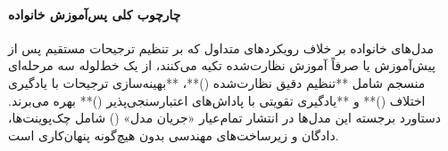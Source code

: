 \item {}

\paragraph*{چارچوب کلی پس‌آموزش خانواده }
مدل‌های خانواده  \cite{olmo3} بر خلاف رویکردهای متداول که بر تنظیم ترجیحات مستقیم پس از پیش‌آموزش یا صرفاً آموزش نظارت‌شده تکیه می‌کنند، از یک خط‌لوله سه مرحله‌ای منسجم شامل **تنظیم دقیق نظارت‌شده ()**، **بهینه‌سازی ترجیحات با یادگیری اختلاف ()** و **یادگیری تقویتی با پاداش‌های اعتبارسنجی‌پذیر ()** بهره می‌برند. دستاورد برجسته این مدل‌ها در انتشار تمام‌عیار «جریان مدل» () شامل چک‌پوینت‌ها، دادگان و زیرساخت‌های مهندسی بدون هیچ‌گونه پنهان‌کاری است.

